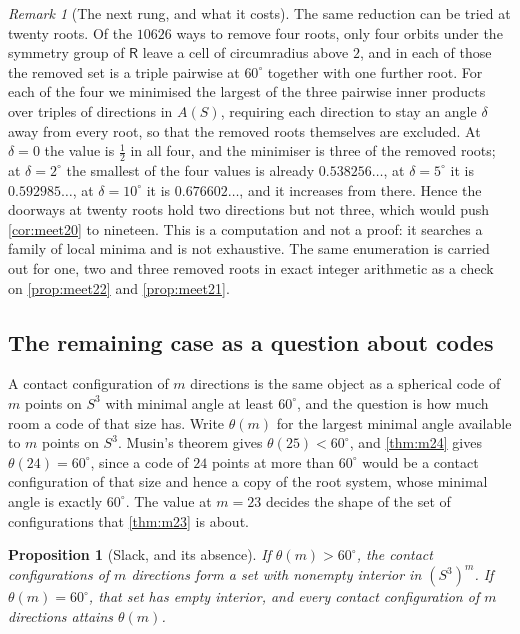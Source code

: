 \documentclass[11pt,reqno]{amsart}
\renewcommand{\_}{\origunderscore\allowbreak}
\numberwithin{equation}{section}
\theoremstyle{plain}
\newtheorem{prop}[thm]{Proposition}
\theoremstyle{definition}
\theoremstyle{remark}
\newtheorem{remark}[thm]{Remark}
\newcommand{\Rt}{\mathsf{R}}                 %
\begin{document}
\begin{remark}[The next rung, and what it costs]\label{rem:meet-next}
The same reduction can be tried at twenty roots. Of the $10626$ ways to
remove four roots, only four orbits under the symmetry group of $\Rt$
leave a cell of circumradius above $2$, and in each of those the removed
set is a triple pairwise at $60^\circ$ together with one further root.
For each of the four we minimised the largest of the three pairwise
inner products over triples of directions in $A(S)$, requiring each
direction to stay an angle $\delta$ away from every root, so that the
removed roots themselves are excluded. At $\delta=0$ the value is
$\tfrac12$ in all four, and the minimiser is three of the removed roots;
at $\delta=2^\circ$ the smallest of the four values is already
$0.538256\ldots$, at $\delta=5^\circ$ it is $0.592985\ldots$, at
$\delta=10^\circ$ it is $0.676602\ldots$, and it increases from there. Hence the
doorways at twenty roots hold two directions but not three, which would
push \cref{cor:meet20} to nineteen. This is a computation and not a
proof: it searches a family of local minima and is not exhaustive. The
same enumeration is carried out for
one, two and three removed roots in exact integer arithmetic as a check on \cref{prop:meet22} and
\cref{prop:meet21}.
\end{remark}

\subsection{The remaining case as a question about codes}\label{sec:m23-codes}

A contact configuration of $m$ directions is the same object as a
spherical code of $m$ points on $S^3$ with minimal angle at least
$60^\circ$, and the question is how much room a code of that size has.
Write $\theta(m)$ for the largest minimal angle available to $m$
points on $S^3$. Musin's theorem \cite{Mus08} gives
$\theta(25)<60^\circ$, and \cref{thm:m24} gives $\theta(24)=60^\circ$,
since a code of $24$ points at more than $60^\circ$ would be a contact
configuration of that size and hence a copy of the root system, whose
minimal angle is exactly $60^\circ$. The value at $m=23$ decides
the shape of the set of configurations that \cref{thm:m23} is about.

\begin{prop}[Slack, and its absence]\label{prop:code-slack}
If $\theta(m)>60^\circ$, the contact configurations of $m$ directions
form a set with nonempty interior in $(S^3)^m$. If $\theta(m)=60^\circ$,
that set has empty interior, and every contact configuration of $m$
directions attains $\theta(m)$.
\end{prop}
\end{document}
